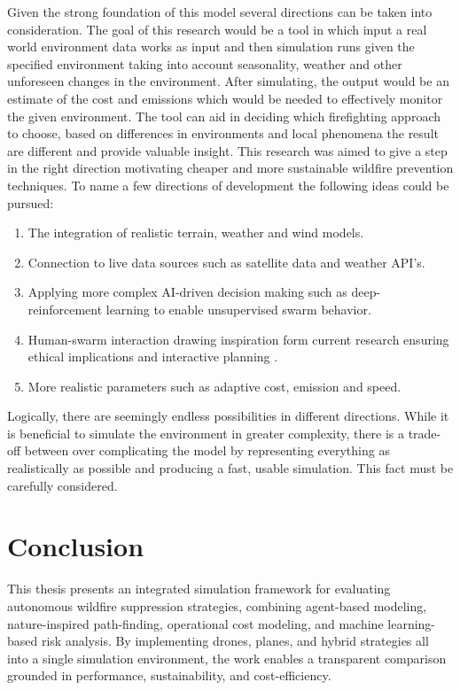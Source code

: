 \documentclass[11pt, a4paper]{article}
\begin{document}
Given the strong foundation of this model several directions can be taken into consideration. The goal of this research would be a tool in which input a real world environment data works as input and then simulation runs given the specified environment taking into account seasonality, weather and other unforeseen changes in the environment. After simulating, the output would be an estimate of the cost and emissions which would be needed to effectively monitor the given environment. The tool can aid in deciding which firefighting approach to choose, based on differences in environments and local phenomena the result are different and provide valuable insight. This research was aimed to give a step in the right direction motivating cheaper and more sustainable wildfire prevention techniques.
To name a few directions of development the following ideas could be pursued:
\begin{enumerate}
    \item The integration of realistic terrain, weather and wind models.
    \item Connection to live data sources such as satellite data and weather API's.
    \item Applying more complex AI-driven decision making such as deep-reinforcement learning to enable unsupervised swarm behavior.
    \item Human-swarm interaction drawing inspiration form current research ensuring ethical implications and interactive planning \cite{lewisHumanFactorsIssues2012}.
    \item More realistic parameters such as adaptive cost, emission and speed.
\end{enumerate}

Logically, there are seemingly endless possibilities in different directions. While it is beneficial to simulate the environment in greater complexity, there is a trade-off between over complicating the model by representing everything as realistically as possible and producing a fast, usable simulation. This fact must be carefully considered.

\section{Conclusion}

This thesis presents an integrated simulation framework for evaluating autonomous wildfire suppression strategies, combining agent-based modeling, nature-inspired path-finding, operational cost modeling, and machine learning-based risk analysis. By implementing drones, planes, and hybrid strategies all into a single simulation environment, the work enables a transparent comparison grounded in performance, sustainability, and cost-efficiency.
\end{document}
